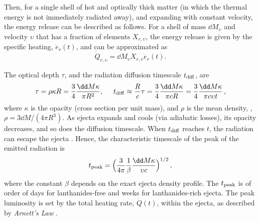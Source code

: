 Then, for a single shell of hot and optically thick matter 
(in which the thermal energy is not immediately radiated away), 
and expanding with constant velocity, 
the energy release 
can be described as follows.
For a shell of mass $\dd M_{\upsilon}$ and velocity $\upsilon$ that has a 
fraction of \rproc{} elements $X_{r,\upsilon}$, the energy release is 
given by the specific heating, $\dot{e}_r(t)$, and can be approximated as 
%
\begin{equation}
\dot{Q}_{r,\upsilon} = \dd M_{\upsilon}X_{r,\upsilon}\dot{e}_{r}(t).
\end{equation}
%

The optical depth $\tau$, and the 
radiation diffusion timescale $t_{\rm diff}$, are  
%
\begin{equation}
\tau = \rho \kappa R = \frac{3}{4}\frac{\dd M\kappa}{\pi R^2}, \hspace{5mm} 
t_{\rm diff} \approx \frac{R}{c}\tau = \frac{3}{4}\frac{\dd M\kappa}{\pi c R} = \frac{3}{4}\frac{\dd M\kappa}{\pi c \upsilon t}\, ,
\end{equation}
%
where 
$\kappa$ is the opacity (cross section per unit mass), and
$\rho$ is the mean density, \ie, $\rho=3 \dd M/(4\pi R^3)$.
%
As ejecta expands and cools (via adiabatic losses), its opacity decreases, 
and so does the diffusion timescale. 
When $t_{\rm diff}$ reaches $t$, the radiation can escape the ejecta \citep{Arnett:1982}. 
Hence, the characteristic timescale of the peak of the emitted radiation is 
%
\begin{equation}
t_{\rm peak} = \Big(\frac{3}{4\pi}\frac{1}{\beta}\frac{\dd M\kappa}{\upsilon c}\Big)^{1/2}\, ,
\end{equation}
%
where the constant $\beta$ depends on the exact ejecta density profile. 
The $t_{\rm peak}$ is of order of days for lanthanides-free and weeks for lanthanides-rich ejecta.
The peak luminosity is set by the total heating rate, $\dot{Q}(t)$, 
within the ejecta, as described by  \textit{Arnett's Law} 
\citep{Arnett:1982}. 


